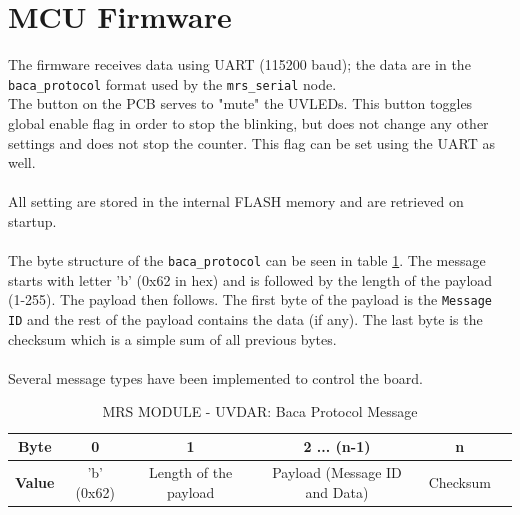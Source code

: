 \documentclass[12pt, a4paper]{article}
\begin{document}
\pagebreak
\section{MCU Firmware}

The firmware receives data using UART (115200 baud); the data are in the \verb|baca_protocol| format used by the \verb|mrs_serial| node.\\
The button on the PCB serves to "mute" the UVLEDs. This button toggles global enable flag in order to stop the blinking, but does not change any other settings and does not stop the counter. This flag can be set using the UART as well.\\
\\
All setting are stored in the internal FLASH memory and are retrieved on startup.\\
\\
The byte structure of the \verb|baca_protocol| can be seen in table \ref{tab:baca_protocol_table}.
The message starts with letter 'b' (0x62 in hex) and is followed by the length of the payload (1-255).
The payload then follows. The first byte of the payload is the \verb|Message ID| and the rest of the payload contains the data (if any). The last byte is the checksum which is a simple sum of all previous bytes.\\
\\
Several message types have been implemented to control the board.

\begin{table}[h]
\begin{tabular}{|c|c|c|c|c|c|}
\hline
\textbf{Byte}   & 0          & 1                     & 2 ... (n-1) & n        \\ \hline
\textbf{Value} & 'b' (0x62) & Length of the payload & Payload (Message ID and Data)       & Checksum \\ \hline
\end{tabular}
\caption{MRS MODULE - UVDAR: Baca Protocol Message}
\label{tab:baca_protocol_table}
\end{table}
\end{document}
